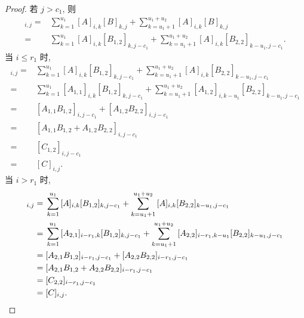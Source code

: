\documentclass[../libro.tex]{subfiles}
\begin{document}
\begin{proof}
    若 \(j > c_1\), 则
    \begin{align*}
        [AB]_{i,j}
        = {} &
        \sum_{k=1}^{u_1}
        {[A]_{i,k} [B]_{k,j}}
        +
        \sum_{k=u_1+1}^{u_1+u_2}
        {[A]_{i,k} [B]_{k,j}}
        \\
        = {} &
        \sum_{k=1}^{u_1}
        {[A]_{i,k} [B_{1,2}]_{k,j-c_1}}
        +
        \sum_{k=u_1+1}^{u_1+u_2}
        {[A]_{i,k} [B_{2,2}]_{k-u_1,j-c_1}}.
    \end{align*}
    当 \(i \leq r_1\) 时,
    \begin{align*}
        [AB]_{i,j}
        = {} &
        \sum_{k=1}^{u_1}
        {[A]_{i,k} [B_{1,2}]_{k,j-c_1}}
        +
        \sum_{k=u_1+1}^{u_1+u_2}
        {[A]_{i,k} [B_{2,2}]_{k-u_1,j-c_1}}
        \\
        = {} &
        \sum_{k=1}^{u_1}
        {[A_{1,1}]_{i,k} [B_{1,2}]_{k,j-c_1}}
        +
        \sum_{k=u_1+1}^{u_1+u_2}
        {[A_{1,2}]_{i,k-u_1} [B_{2,2}]_{k-u_1,j-c_1}}
        \\
        = {} &
        [A_{1,1} B_{1,2}]_{i,j-c_1}
        + [A_{1,2} B_{2,2}]_{i,j-c_1}
        \\
        = {} &
        [A_{1,1} B_{1,2} + A_{1,2} B_{2,2}]_{i,j-c_1}
        \\
        = {} &
        [C_{1,2}]_{i,j-c_1}
        \\
        = {} &
        [C]_{i,j}.
    \end{align*}
    当 \(i > r_1\) 时,
    \begin{align*}
        [AB]_{i,j}
        = {} &
        \sum_{k=1}^{u_1}
        {[A]_{i,k} [B_{1,2}]_{k,j-c_1}}
        +
        \sum_{k=u_1+1}^{u_1+u_2}
        {[A]_{i,k} [B_{2,2}]_{k-u_1,j-c_1}}
        \\
        = {} &
        \sum_{k=1}^{u_1}
        {[A_{2,1}]_{i-r_1,k} [B_{1,2}]_{k,j-c_1}}
        +
        \sum_{k=u_1+1}^{u_1+u_2}
        {[A_{2,2}]_{i-r_1,k-u_1} [B_{2,2}]_{k-u_1,j-c_1}}
        \\
        = {} &
        [A_{2,1} B_{1,2}]_{i-r_1,j-c_1}
        + [A_{2,2} B_{2,2}]_{i-r_1,j-c_1}
        \\
        = {} &
        [A_{2,1} B_{1,2} + A_{2,2} B_{2,2}]_{i-r_1,j-c_1}
        \\
        = {} &
        [C_{2,2}]_{i-r_1,j-c_1}
        \\
        = {} &
        [C]_{i,j}.
        \qedhere
    \end{align*}
\end{proof}
\end{document}
